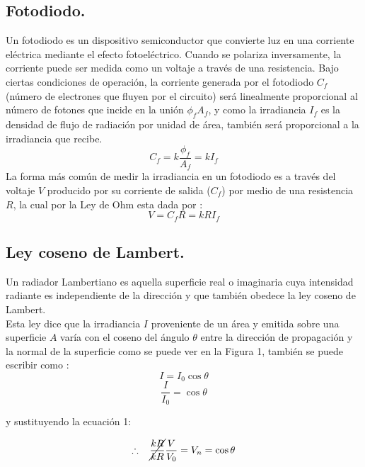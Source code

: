 \documentclass[DIV=calc, paper=a4, fontsize=11pt]{scrartcl}
\begin{document}
\subsection*{\textcolor{carmine}{Fotodiodo.}}%
Un fotodiodo es un dispositivo semiconductor que convierte luz en una corriente eléctrica mediante el efecto fotoeléctrico. Cuando se polariza inversamente, la corriente puede ser medida como un voltaje a través de una resistencia.
Bajo ciertas condiciones de operación, la corriente generada por el fotodiodo $C_f$ (número de electrones que fluyen por el circuito) será linealmente proporcional al número de fotones que incide en la unión $\phi_fA_f$, y como la irradiancia $I_f$ es la densidad de flujo de radiación por unidad de área, también será proporcional a la irradiancia que recibe\cite{Manual}.
\begin{equation*}
    C_f = k \frac{\phi_f}{A_f}= kI_f
\end{equation*}
La forma más común de medir la irradiancia en un fotodiodo es a través del voltaje $V$ producido por su corriente de salida ($C_f$) por medio de una resistencia $R$, la cual por la Ley de Ohm esta dada por \cite{Manual}:
\begin{equation}
    V= C_f R = k R I_f
\end{equation}
\subsection*{\textcolor{carmine}{Ley coseno de Lambert.}}

Un radiador Lambertiano es aquella superficie real o imaginaria cuya intensidad radiante es independiente de la dirección y que también obedece la ley coseno de Lambert.\\
Esta ley dice que la irradiancia $I$ proveniente de un área y emitida sobre una superficie $A$ varía con el coseno del ángulo $\theta$ entre la dirección de propagación y la normal de la superficie como se puede ver en la Figura 1, también se puede escribir como \cite{book}:
\begin{equation*}
    I = I_0 \cos{\theta}
\end{equation*}
\begin{equation*}
    \frac{I}{I_0} = \cos{\theta}
\end{equation*}

y sustituyendo la ecuación 1:

\begin{equation}
    \therefore \hspace{0.3cm}  \cancel{\frac{kR}{kR}}\frac{V}{V_0} =V_n= \cos{\theta}
\end{equation}
\end{document}
